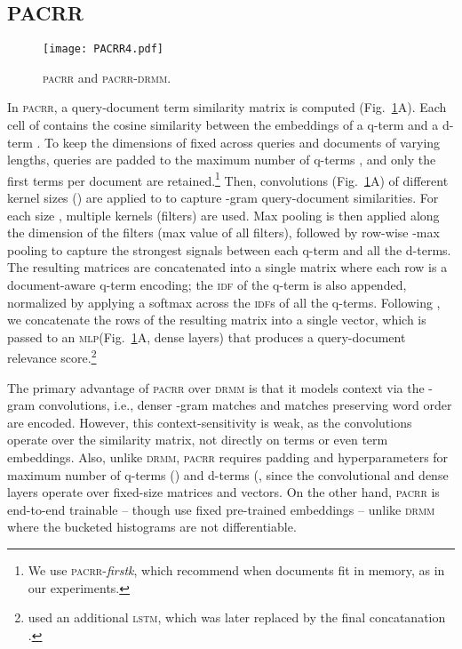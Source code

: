 \documentclass[11pt,a4paper]{article}
\newcommand{\mlp}{\textsc{mlp}\xspace}
\newcommand{\lstm}{\textsc{lstm}\xspace}
\newcommand{\drmm}{\textsc{drmm}\xspace}
\newcommand{\pacrr}{\textsc{pacrr}\xspace}
\newcommand{\pacrrdrmm}{\textsc{pacrr-drmm}\xspace}
\newcommand{\idf}{\textsc{idf}\xspace}
\begin{document}
\subsection{PACRR}
\label{sec:pacrr}

\begin{figure}[t]
\texttt{[image: PACRR4.pdf]}
\vspace{-0.17in}
\caption{\pacrr \cite{hui2017pacrr} and \pacrrdrmm.}
\vspace{-4mm}
\label{fig:pacrr}
\end{figure}

In \pacrr \cite{hui2017pacrr}, a query-document term similarity matrix 
 is computed (Fig.~\ref{fig:pacrr}A). Each cell  of 
 contains the cosine similarity between the embeddings of a
q-term  and a d-term . 
To keep the dimensions  of 
 fixed across queries and documents of varying lengths, queries are padded to the maximum number of 
q-terms , and only 
the first  terms per document are retained.\footnote{We use \textsc{pacrr}-\textit{firstk}, which 
 recommend when documents fit in memory, as in our experiments.}
Then, convolutions (Fig.~\ref{fig:pacrr}A) of different kernel sizes  () are applied to 
 to capture -gram query-document similarities. For each size  , multiple kernels (filters) are used. Max pooling is then applied along the dimension of the filters (max value of all filters), 
followed by row-wise -max pooling to capture the strongest  signals between each 
q-term and all the d-terms. 
The resulting matrices are concatenated into a single matrix where each row is a 
document-aware q-term encoding; the \idf of the q-term is also appended, normalized by applying a softmax across the \idf{s} of all the q-terms.
Following , we concatenate the rows of the resulting matrix into a single vector, which is passed to an \mlp (Fig.~\ref{fig:pacrr}A, dense layers) that produces a query-document relevance score.\footnote{ used an additional \lstm, which was later replaced by the final concatanation \cite{hui2018copacrr}.}

The primary advantage of \pacrr over \drmm is that it models context via the -gram convolutions, i.e., denser -gram matches and matches preserving word order are encoded. However, this context-sensitivity is weak, as the convolutions operate over the similarity matrix, not directly on terms or even term embeddings. Also, unlike \drmm, \pacrr requires padding and hyperparameters for maximum number of q-terms () and d-terms (, since 
the convolutional and dense layers operate over fixed-size matrices and vectors.
On the other hand, \pacrr is end-to-end trainable -- though  use fixed pre-trained embeddings -- unlike \drmm where the bucketed histograms are not differentiable. 
\end{document}
